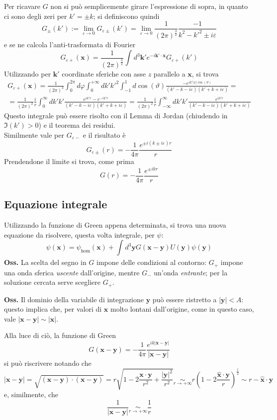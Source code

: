 Per ricavare $G$ non si può semplicemente girare l'espressione di sopra, in quanto ci sono degli zeri
per $k'=\pm k$; si definiscono quindi
$$G_{\pm}(k'):=\lim\limits_{\varepsilon\to0}G_{\varepsilon\pm}(k') = \lim\limits_{\varepsilon\to0}
\frac{1}{(2\pi)^{\frac{3}{2}}}\frac{-1}{k^2-k'^2\pm i\varepsilon}
$$
e se ne calcola l'anti-trasformata di Fourier
$$G_{\varepsilon+}(\mathbf{x}) = \frac{1}{(2\pi)^{\frac{3}{2}}}
\int_{}^{}d^3\mathbf{k'} e^{-i\mathbf{k'}\cdot\mathbf{x}}G_{\varepsilon+}(k')
$$
Utilizzando per $\mathbf{k'}$ coordinate sferiche con asse $z$ parallelo a $\mathbf{x}$, si trova
\begin{gather*}
G_{\varepsilon+}(\mathbf{x}) = \frac{1}{(2\pi)^3}
\int_{0}^{2\pi}d\varphi\int_{0}^{+\infty}dk'k'^2\int_{-1}^{1}d\cos(\vartheta)
\frac{-e^{ik'|x|\cos(\vartheta)}}{(k'-k-i\varepsilon)(k'+k+i\varepsilon)}=\\
=\frac{1}{(2\pi)^2}\frac{i}{r}\int_{0}^{\infty}dk'k'\frac{e^{ik'r}-e^{-ik'r}}
{(k'-k-i\varepsilon)(k'+k+i\varepsilon)}=
\frac{1}{(2\pi)^2}\frac{i}{r}\int_{-\infty}^{\infty}dk'k'\frac{e^{ik'r}}
{(k'-k-i\varepsilon)(k'+k+i\varepsilon)}
\end{gather*}
Questo integrale può essere risolto con il Lemma di Jordan (chiudendo in $\Im(k')>0$) e il teorema
dei residui.
\\
Similmente vale per $G_{\varepsilon-}$ e il risultato è
$$G_{\varepsilon\pm}(r) = -\frac{1}{4\pi}\frac{e^{\pm i(k\pm i\varepsilon)r}}{r}$$
Prendendone il limite si trova, come prima
$$\boxed{G(r) = -\frac{1}{4\pi}\frac{e^{\pm ikr}}{r}}$$
\subsection{Equazione integrale}
Utilizzando la funzione di Green appena determinata, si trova una nuova equazione da risolvere,
questa volta integrale, per $\psi$:
$$\psi(\mathbf{x})= \psi_\text{hom}(\mathbf{x})+\int_{}^{}d^3\mathbf{y}
G(\mathbf{x}-\mathbf{y})U(\mathbf{y})\psi(\mathbf{y})$$
\textbf{Oss.} La scelta del segno in $G$ impone delle condizioni al contorno: $G_+$ impone
una onda sferica \textit{uscente} dall'origine, mentre $G_-$ un'onda \textit{entrante}; per la
soluzione cercata serve scegliere $G_+$.

\textbf{Oss.} Il dominio della variabile di integrazione $\mathbf{y}$ può essere ristretto a
$|\mathbf{y}|<A$: questo implica che, per valori di $\mathbf{x}$ molto lontani dall'origine, come
in questo caso, vale $|\mathbf{x}-\mathbf{y}|\sim|\mathbf{x}|$.

Alla luce di ciò, la funzione di Green
$$G(\mathbf{x}-\mathbf{y})= -\frac{1}{4\pi}\frac{e^{ik|\mathbf{x}-\mathbf{y}|}}
{|\mathbf{x}-\mathbf{y}|}$$
si può riscrivere notando che
$$|\mathbf{x}-\mathbf{y}| = \sqrt{(\mathbf{x}-\mathbf{y})\cdot(\mathbf{x}-\mathbf{y})} = 
r\sqrt{1-2\frac{\mathbf{x}\cdot\mathbf{y}}{r^2}+\frac{|\mathbf{y}|^2}{r^2}}\underset{r\to+\infty}\sim
r\left(1-2\frac{\mathbf{\hat x}\cdot\mathbf{y}}{r}\right)^{\frac{1}{2}}\sim r - \mathbf{\hat x}\cdot
\mathbf{y}$$
e, similmente, che
$$\frac{1}{|\mathbf{x}-\mathbf{y}|}\underset{r\to+\infty}\sim\frac{1}{r}$$

